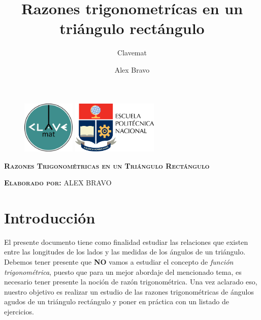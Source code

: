 \documentclass[12pt]{article}
\title{Razones trigonometr\'icas en un tri\'angulo rect\'angulo}
\author{Clavemat}
\date{Alex Bravo }
\begin{document}
\begin{figure}[h!]
    \begin{minipage}[t]{0.45\textwidth}
        \flushleft \includegraphics[height=2.5cm]{clave.jpg}
    \end{minipage}\hfill
    \begin{minipage}[t]{0.45\textwidth}
        \flushright \includegraphics[height=2.5cm]{poli.png}
    \end{minipage}
\end{figure}
\begin{center}
    {\Large \textsc{\textbf{Razones Trigonométricas en un Triángulo Rectángulo}}}
\end{center}
{}
\begin{flushleft}
    \textsc{\large { \textbf{Elaborado por:} ALEX BRAVO}}
\end{flushleft}
\section{Introducci\'on}
El presente documento tiene como finalidad estudiar las relaciones que existen entre las longitudes de los lados y las medidas de los \'angulos de un tri\'angulo.\\

Debemos tener presente que \textbf{NO} vamos a estudiar el concepto de \textit{funci\'on trigonom\'etrica}, puesto que para un mejor abordaje del mencionado tema,  es necesario tener presente la noci\'on de raz\'on trigonom\'etrica. Una vez aclarado eso, nuestro objetivo es realizar un estudio de las razones trigonom\'etricas de \'angulos agudos de un tri\'angulo rect\'angulo y poner en pr\'actica con un listado de ejercicios.\\
\end{document}
